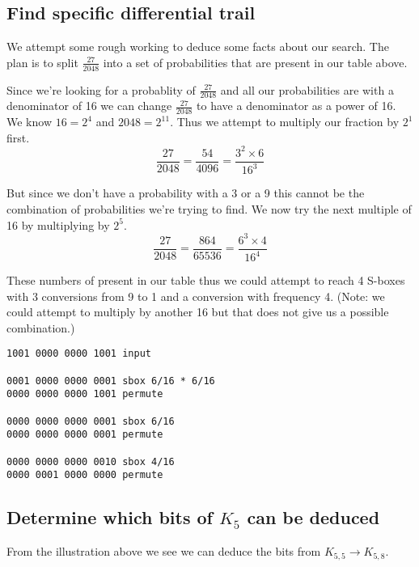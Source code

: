\documentclass{article}
\begin{document}
\subsection{Find specific differential trail}
We attempt some rough working to deduce some facts about our search.
The plan is to split $\frac{27}{2048}$ into a set of probabilities that
are present in our table above.

Since we're looking for a probablity of $\frac{27}{2048}$ and all our
probabilities are with a denominator of 16 we can change $\frac{27}{2048}$
to have a denominator as a power of 16. We know $16 = 2^4$ and $2048 = 2^11$.
Thus we attempt to multiply our fraction by $2^1$ first.
\[
    \frac{27}{2048} = \frac{54}{4096} = \frac{3^2 \times 6}{16^3}
\]

But since we don't have a probability with a 3 or a 9 this cannot be the
combination of probabilities we're trying to find. We now try the next
multiple of 16 by multiplying by $2^5$.
\[
    \frac{27}{2048} = \frac{864}{65536} = \frac{6^3 \times 4}{16^4}
\]

These numbers of present in our table thus we could attempt to reach 4
S-boxes with 3 conversions from 9 to 1 and a conversion with frequency 4.
(Note: we could attempt to multiply by another 16 but that does not give
us a possible combination.)

\begin{verbatim}
1001 0000 0000 1001 input

0001 0000 0000 0001 sbox 6/16 * 6/16
0000 0000 0000 1001 permute

0000 0000 0000 0001 sbox 6/16
0000 0000 0000 0001 permute

0000 0000 0000 0010 sbox 4/16
0000 0001 0000 0000 permute
\end{verbatim}

\subsection{Determine which bits of $K_5$ can be deduced}
From the illustration above we see we can deduce the bits from
$K_{5,5} \to K_{5,8}$.
\end{document}
